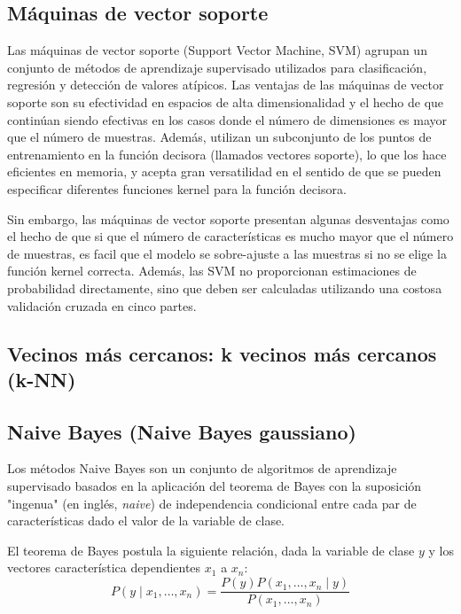 \subsection{Máquinas de vector soporte}


Las máquinas de vector soporte (Support Vector Machine, SVM) agrupan un conjunto de métodos de aprendizaje supervisado utilizados para clasificación, regresión y detección de valores atípicos. Las ventajas de las máquinas de vector soporte son su efectividad en espacios de alta dimensionalidad y el hecho de que continúan siendo efectivas en los casos donde el número de dimensiones es mayor que el número de muestras.
Además, utilizan un subconjunto de los puntos de entrenamiento en la función decisora (llamados vectores soporte), lo que los hace eficientes en memoria, y acepta gran versatilidad en el sentido de que se pueden especificar diferentes funciones kernel para la función decisora.

Sin embargo, las máquinas de vector soporte presentan algunas desventajas como el hecho de que si que el número de características es mucho mayor que el número de muestras, es facil que el modelo se sobre-ajuste a las muestras si no se elige la función kernel correcta. 
Además, las SVM no proporcionan estimaciones de probabilidad directamente, sino que deben ser calculadas utilizando una costosa validación cruzada en cinco partes.

\subsection{Vecinos más cercanos: k vecinos más cercanos (k-NN)}
\subsection{Naive Bayes (Naive Bayes gaussiano)}


Los métodos Naive Bayes son un conjunto de algoritmos de aprendizaje supervisado basados en la aplicación del teorema de Bayes con la suposición "ingenua" (en inglés, \emph{naive}) de independencia condicional entre cada par de características dado el valor de la variable de clase. 

El teorema de Bayes postula la siguiente relación, dada la variable de clase $y$ y los vectores característica dependientes $x_{1}$ a $x_{n}$:
\begin{equation*}
    P(y \mid x_{1},\dots,x_{n}) = \dfrac{P(y)P(x_{1},\dots,x_{n}\mid y)}{P(x_{1},\dots,x_{n})}
\end{equation*}


